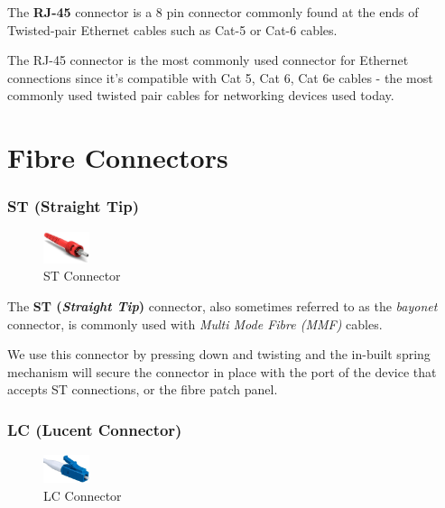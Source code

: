 The \textbf{RJ-45} connector is a 8 pin connector commonly found at the ends of Twisted-pair Ethernet cables such as Cat-5 or Cat-6 cables.

The RJ-45 connector is the most commonly used connector for Ethernet connections since it's compatible with Cat 5, Cat 6, Cat 6e cables - the most commonly used twisted pair cables for networking devices used today. 

\section{Fibre Connectors}
\subsubsection{ST (Straight Tip)}
\vspace{-10pt}
\begin{figure}
	\centering
	\vspace{-12pt}
	\includegraphics[width=0.12\textwidth]{"Mod1/chapters/1.4.k ST Connector"}
	\caption{\label{fig:st_con}ST Connector}
	\vspace{-15pt}
\end{figure}

The \textbf{ST (\textit{Straight Tip})} connector, also sometimes referred to as the \textit{bayonet} connector, is commonly used with \textit{Multi Mode Fibre (MMF)} cables. 

We use this connector by pressing down and twisting and the in-built spring mechanism will secure the connector in place with the port of the device that accepts ST connections, or the fibre patch panel. 

\subsubsection{LC (Lucent Connector)}
\vspace{-10pt}
\begin{figure}
	\centering
	\vspace{-12pt}
	\includegraphics[width=0.12\textwidth]{"Mod1/chapters/1.4.l LC Connector"}
	\caption{\label{fig:lc_con}LC Connector}
	\vspace{-15pt}
\end{figure}

